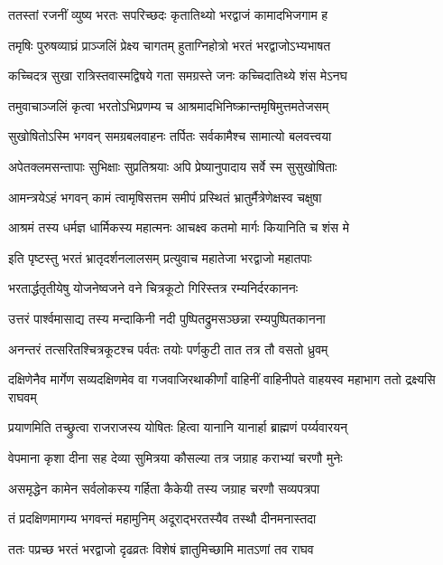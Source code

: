
\twolineshloka
{ततस्तां रजनीं व्युष्य भरतः सपरिच्छदः}
{कृतातिथ्यो भरद्वाजं कामादभिजगाम ह} %

\twolineshloka
{तमृषिः पुरुषव्याघ्रं प्राञ्जलिं प्रेक्ष्य चागतम्}
{हुताग्निहोत्रो भरतं भरद्वाजोऽभ्यभाषत} %

\twolineshloka
{कच्चिदत्र सुखा रात्रिस्तवास्मद्विषये गता}
{समग्रस्ते जनः कच्चिदातिथ्ये शंस मेऽनघ} %

\twolineshloka
{तमुवाचाञ्जलिं कृत्वा भरतोऽभिप्रणम्य च}
{आश्रमादभिनिष्क्रान्तमृषिमुत्तमतेजसम्} %

\twolineshloka
{सुखोषितोऽस्मि भगवन् समग्रबलवाहनः}
{तर्पितः सर्वकामैश्च सामात्यो बलवत्त्वया} %

\twolineshloka
{अपेतक्लमसन्तापाः सुभिक्षाः सुप्रतिश्रयाः}
{अपि प्रेष्यानुपादाय सर्वे स्म सुसुखोषिताः} %

\twolineshloka
{आमन्त्रयेऽहं भगवन् कामं त्वामृषिसत्तम}
{समीपं प्रस्थितं भ्रातुर्मैत्रेणेक्षस्व चक्षुषा} %

\twolineshloka
{आश्रमं तस्य धर्मज्ञ धार्मिकस्य महात्मनः}
{आचक्ष्व कतमो मार्गः कियानिति च शंस मे} %

\twolineshloka
{इति पृष्टस्तु भरतं भ्रातृदर्शनलालसम्}
{प्रत्युवाच महातेजा भरद्वाजो महातपाः} %

\twolineshloka
{भरतार्द्धतृतीयेषु योजनेष्वजने वने}
{चित्रकूटो गिरिस्तत्र रम्यनिर्दरकाननः} %

\twolineshloka
{उत्तरं पार्श्वमासाद्य तस्य मन्दाकिनी नदी}
{पुष्पितद्रुमसञ्छन्ना रम्यपुष्पितकानना} %

\twolineshloka
{अनन्तरं तत्सरितश्चित्रकूटश्च पर्वतः}
{तयोः पर्णकुटी तात तत्र तौ वसतो ध्रुवम्} %

\threelineshloka
{दक्षिणेनैव मार्गेण सव्यदक्षिणमेव वा}
{गजवाजिरथाकीर्णां वाहिनीं वाहिनीपते}
{वाहयस्व महाभाग ततो द्रक्ष्यसि राघवम्} %

\twolineshloka
{प्रयाणमिति तच्छ्रुत्वा राजराजस्य योषितः}
{हित्वा यानानि यानार्हा ब्राह्मणं पर्य्यवारयन्} %

\twolineshloka
{वेपमाना कृशा दीना सह देव्या सुमित्रया}
{कौसल्या तत्र जग्राह कराभ्यां चरणौ मुनेः} %

\twolineshloka
{असमृद्धेन कामेन सर्वलोकस्य गर्हिता}
{कैकेयी तस्य जग्राह चरणौ सव्यपत्रपा} %

\twolineshloka
{तं प्रदक्षिणमागम्य भगवन्तं महामुनिम्}
{अदूराद्भरतस्यैव तस्थौ दीनमनास्तदा} %

\twolineshloka
{ततः पप्रच्छ भरतं भरद्वाजो दृढव्रतः}
{विशेषं ज्ञातुमिच्छामि मातऽणां तव राघव} %

